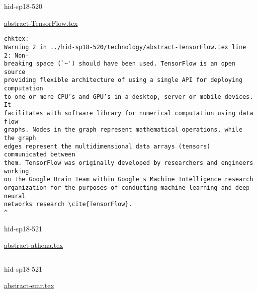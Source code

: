 \begin{IU}

hid-sp18-520

\href{https://github.com/cloudmesh-community/hid-sp18-520/blob/master//technology/abstract-TensorFlow.tex}{abstract-TensorFlow.tex}

\begin{tiny}
\begin{verbatim}
chktex:
Warning 2 in ../hid-sp18-520/technology/abstract-TensorFlow.tex line 2: Non-
breaking space (`~') should have been used. TensorFlow is an open source
providing flexible architecture of using a single API for deploying computation
to one or more CPU’s and GPU’s in a desktop, server or mobile devices. It
facilitates with software library for numerical computation using data flow
graphs. Nodes in the graph represent mathematical operations, while the graph
edges represent the multidimensional data arrays (tensors) communicated between
them. TensorFlow was originally developed by researchers and engineers working
on the Google Brain Team within Google's Machine Intelligence research
organization for the purposes of conducting machine learning and deep neural
networks research \cite{TensorFlow}.
^
\end{verbatim}
\end{tiny}
\end{IU}



\begin{IU}

hid-sp18-521

\href{https://github.com/cloudmesh-community/hid-sp18-521/blob/master//technology/abstract-athena.tex}{abstract-athena.tex}

\begin{tiny}
\begin{verbatim}
\end{verbatim}
\end{tiny}
\end{IU}



\begin{IU}

hid-sp18-521

\href{https://github.com/cloudmesh-community/hid-sp18-521/blob/master//technology/abstract-emr.tex}{abstract-emr.tex}

\begin{tiny}
\begin{verbatim}
\end{verbatim}
\end{tiny}
\end{IU}

